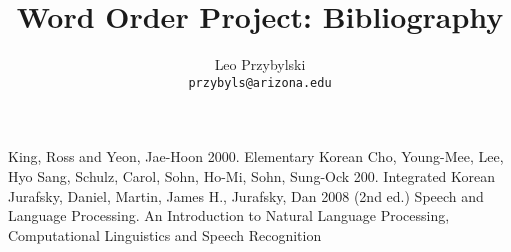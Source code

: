 \documentclass[11pt]{report}
\title{Word Order Project: Bibliography}
\author{Leo Przybylski\\
\texttt{przybyls@arizona.edu}}
\begin{document}
\maketitle
\begin{thebibliography}{9}
   King, Ross and Yeon, Jae-Hoon 2000. Elementary Korean
   Cho, Young-Mee, Lee, Hyo Sang, Schulz, Carol,
    Sohn, Ho-Mi, Sohn, Sung-Ock 200. Integrated Korean
   Jurafsky, Daniel, Martin, James H., Jurafsky, Dan
    2008 (2nd ed.) Speech and Language Processing. An Introduction to Natural Language Processing, Computational Linguistics and Speech Recognition
\end{thebibliography}
\end{document}
